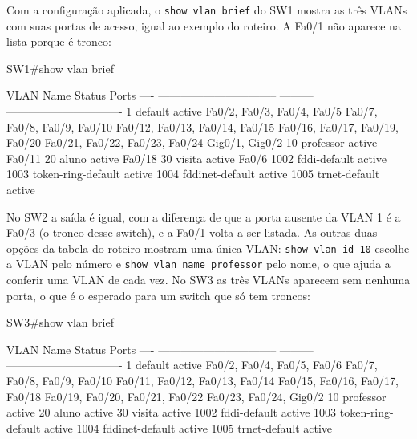
Com a configuração aplicada, o \texttt{show vlan brief} do SW1 mostra as três VLANs com suas portas de acesso, igual ao exemplo do roteiro. A Fa0/1 não aparece na lista porque é tronco:

\begin{saida}
SW1#show vlan brief

VLAN Name                             Status    Ports
---- -------------------------------- --------- -------------------------------
1    default                          active    Fa0/2, Fa0/3, Fa0/4, Fa0/5
                                                Fa0/7, Fa0/8, Fa0/9, Fa0/10
                                                Fa0/12, Fa0/13, Fa0/14, Fa0/15
                                                Fa0/16, Fa0/17, Fa0/19, Fa0/20
                                                Fa0/21, Fa0/22, Fa0/23, Fa0/24
                                                Gig0/1, Gig0/2
10   professor                        active    Fa0/11
20   aluno                            active    Fa0/18
30   visita                           active    Fa0/6
1002 fddi-default                     active
1003 token-ring-default               active
1004 fddinet-default                  active
1005 trnet-default                    active
\end{saida}

No SW2 a saída é igual, com a diferença de que a porta ausente da VLAN 1 é a Fa0/3 (o tronco desse switch), e a Fa0/1 volta a ser listada. As outras duas opções da tabela do roteiro mostram uma única VLAN: \texttt{show vlan id 10} escolhe a VLAN pelo número e \texttt{show vlan name professor} pelo nome, o que ajuda a conferir uma VLAN de cada vez. No SW3 as três VLANs aparecem sem nenhuma porta, o que é o esperado para um switch que só tem troncos:

\begin{saida}
SW3#show vlan brief

VLAN Name                             Status    Ports
---- -------------------------------- --------- -------------------------------
1    default                          active    Fa0/2, Fa0/4, Fa0/5, Fa0/6
                                                Fa0/7, Fa0/8, Fa0/9, Fa0/10
                                                Fa0/11, Fa0/12, Fa0/13, Fa0/14
                                                Fa0/15, Fa0/16, Fa0/17, Fa0/18
                                                Fa0/19, Fa0/20, Fa0/21, Fa0/22
                                                Fa0/23, Fa0/24, Gig0/2
10   professor                        active
20   aluno                            active
30   visita                           active
1002 fddi-default                     active
1003 token-ring-default               active
1004 fddinet-default                  active
1005 trnet-default                    active
\end{saida}

